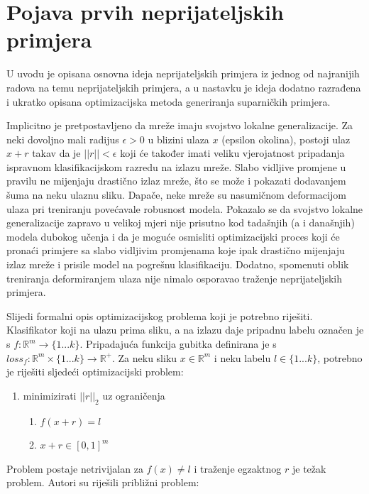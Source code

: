 \documentclass[utf8, diplomski]{fer}
\begin{document}
\section{Pojava prvih neprijateljskih primjera}
U uvodu je opisana osnovna ideja neprijateljskih primjera iz jednog od najranijih radova na temu neprijateljskih primjera\citep{Szegedy2014IntriguingPO}, a u nastavku je ideja dodatno razrađena i ukratko opisana optimizacijska metoda generiranja suparničkih primjera.
\par
Implicitno je pretpostavljeno da mreže imaju svojstvo lokalne generalizacije. Za neki dovoljno mali radijus $\epsilon > 0$ u blizini ulaza $x$ (epsilon okolina), postoji ulaz $x + r$ takav da je $||r|| < \epsilon$ koji će također imati veliku vjerojatnost pripadanja ispravnom klasifikacijskom razredu na izlazu mreže. Slabo vidljive promjene u pravilu ne mijenjaju drastično izlaz mreže, što se može i pokazati dodavanjem šuma na neku ulaznu sliku. Dapače, neke mreže su nasumičnom deformacijom ulaza pri treniranju povećavale robusnost modela. Pokazalo se da svojstvo lokalne generalizacije zapravo u velikoj mjeri nije prisutno kod tadašnjih (a i današnjih) modela dubokog učenja i da je moguće osmisliti optimizacijski proces koji će pronaći primjere sa slabo vidljivim promjenama koje ipak drastično mijenjaju izlaz mreže i prisile model na pogrešnu klasifikaciju. Dodatno, spomenuti oblik treniranja deformiranjem ulaza nije nimalo osporavao traženje neprijateljskih primjera.
\par
Slijedi formalni opis optimizacijskog problema koji je potrebno riješiti. \\
Klasifikator koji na ulazu prima sliku, a na izlazu daje pripadnu labelu označen je s $f : \mathbb{R}^{m} \rightarrow \{1...k\}$. Pripadajuća funkcija gubitka definirana je s $loss_{f} : \mathbb{R}^{m}\times\{1...k\} \rightarrow \mathbb{R}^{+}$. Za neku sliku $x \in \mathbb{R}^{m}$ i neku labelu $l \in \{1...k\}$, potrebno je riješiti sljedeći optimizacijski problem:
\begin{enumerate}[noitemsep, label=\textbullet]\label{original_formulation}
  \item minimizirati $||r||_{2}$ uz ograničenja
  \begin{enumerate}
  \item $f(x+r) = l$
  \item $x + r \in [0, 1]^{m}$
  \end{enumerate}
\end{enumerate}
Problem postaje netrivijalan za $f(x) \neq l$ i traženje egzaktnog $r$ je težak problem. Autori su riješili približni problem:
\end{document}
